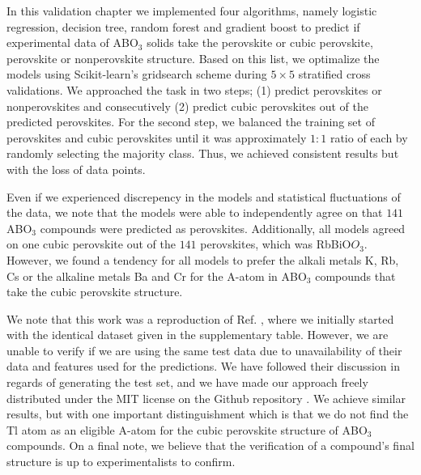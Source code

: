 In this validation chapter we implemented four algorithms, namely logistic regression, decision tree, random forest and gradient boost to predict if experimental data of ABO$_3$ solids take the perovskite or cubic perovskite, perovskite or nonperovskite structure. Based on this list, we optimalize the models using Scikit-learn's \cite{Pedregosa2012} gridsearch scheme during $5\times 5$ stratified cross validations. We approached the task in two steps; (1) predict perovskites or nonperovskites and consecutively (2) predict cubic perovskites out of the predicted perovskites. For the second step, we balanced the training set of perovskites and cubic perovskites until it was approximately $1:1$ ratio of each by randomly selecting the majority class. Thus, we achieved consistent results but with the loss of data points.

Even if we experienced discrepency in the models and statistical fluctuations of the data, we note that the models were able to independently agree on that $141$ ABO$_3$ compounds were predicted as perovskites. Additionally, all models agreed on one cubic perovskite out of the $141$ perovskites, which was RbBiO$O_3$. However, we found a tendency for all models to prefer the alkali metals K, Rb, Cs or the alkaline metals Ba and Cr for the A-atom in ABO$_3$ compounds that take the cubic perovskite structure.

We note that this work was a reproduction of Ref. \cite{Balachandran2018}, where we initially started with the identical dataset given in the supplementary table. However, we are unable to verify if we are using the same test data due to unavailability of their data and features used for the predictions. We have followed their discussion in regards of generating the test set, and we have made our approach freely distributed under the MIT license on the Github repository \cite{Ohebbi2021a}. We achieve similar results, but with one important distinguishment which is that we do not find the Tl atom as an eligible A-atom for the cubic perovskite structure of ABO$_3$ compounds. On a final note, we believe that the verification of a compound's final structure is up to experimentalists to confirm.
